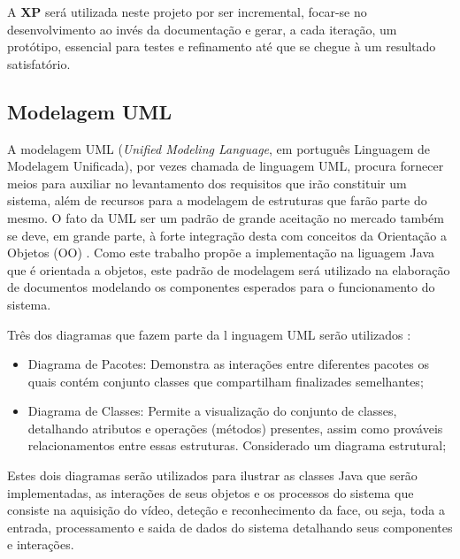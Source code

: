 A \textbf{XP} será utilizada neste projeto por ser incremental, focar-se no desenvolvimento ao invés da documentação e gerar, a cada iteração, um protótipo, essencial para testes e refinamento até que se chegue à um resultado satisfatório.



\subsection{Modelagem UML}\label{subsec:uml}

A modelagem UML (\textit{Unified Modeling Language}, em português Linguagem de Modelagem Unificada), por vezes chamada de linguagem UML, procura fornecer meios para auxiliar no levantamento dos requisitos que irão constituir um sistema, além de recursos para a modelagem de estruturas que farão parte do mesmo. O fato da UML ser um padrão de grande aceitação no mercado também se deve, em grande parte, à forte integração desta com conceitos da Orientação a Objetos (OO) \cite{uml}. Como este trabalho propõe a implementação na liguagem Java que é orientada a objetos, este padrão de modelagem será utilizado na elaboração de documentos modelando os componentes esperados para o funcionamento do sistema.

Três dos diagramas que fazem parte da l inguagem UML serão utilizados \cite{uml}:



\begin{itemize}
	\item Diagrama de Pacotes: Demonstra as interações entre diferentes pacotes os quais contém conjunto classes que compartilham finalizades semelhantes;
	
	\item Diagrama de Classes: Permite a visualização do conjunto de classes, detalhando atributos e operações (métodos) presentes, assim como prováveis relacionamentos entre essas estruturas. Considerado um diagrama estrutural;	

\end{itemize}

Estes dois diagramas serão utilizados para ilustrar as classes Java que serão implementadas, as interações de seus objetos e os processos do sistema que consiste na aquisição do vídeo, deteção e reconhecimento da face, ou seja, toda a entrada, processamento e saida de dados do sistema detalhando seus componentes e interações.


